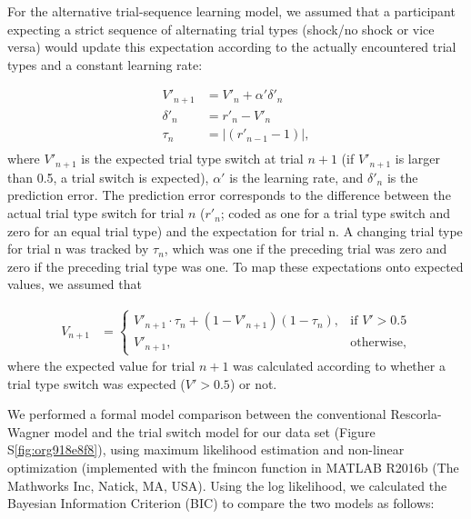 \documentclass[12pt]{article}
\begin{document}
For the alternative trial-sequence learning model, we assumed that a
participant expecting a strict sequence of alternating trial types
(shock/no shock or vice versa) would update this expectation according
to the actually encountered trial types and a constant learning rate:

\begin{equation}
\begin{aligned}
V'_{n+1} &= V'_{n} + \alpha' \delta'_{n} \\
\delta'_{n} &= r'_{n} - V'_{n} \\
\tau_{n} &= \lvert (r'_{n-1} - 1) \rvert, \\
\end{aligned}
\end{equation}
where \(V'_{n+1}\) is the expected trial type switch at trial \(n+1\) (if
\(V'_{n+1}\) is larger than 0.5, a trial switch is expected), \(\alpha'\) is
the learning rate, and \(\delta'_{n}\) is the prediction error. The
prediction error corresponds to the difference between the actual trial
type switch for trial \(n\) (\(r'_{n}\); coded as one for a trial type
switch and zero for an equal trial type) and the expectation for trial
n. A changing trial type for trial n was tracked by \(\tau_{n}\), which
was one if the preceding trial was zero and zero if the preceding trial
type was one. To map these expectations onto expected values, we assumed
that

\begin{equation}
\begin{aligned}
V_{n+1} &= 
\begin{cases}
V'_{n+1} \cdot \tau_{n} + (1 - V'_{n+1}) (1 - \tau_{n}), & \text{if } V' > 0.5 \\
V'_{n+1},                              & \text{otherwise},  
\end{cases}
\end{aligned}
\end{equation}
where the expected value for trial \(n+1\) was calculated according to
whether a trial type switch was expected (\(V' > 0.5\)) or not.  

We performed a formal model comparison between the conventional
Rescorla-Wagner model and the trial switch model for our data set
(Figure S\ref{fig:org918e8f8}), using maximum likelihood estimation and
non-linear optimization (implemented with the fmincon function in MATLAB
R2016b (The Mathworks Inc, Natick, MA, USA). Using the log likelihood,
we calculated the Bayesian Information Criterion (BIC) to compare the
two models as follows:
\end{document}
